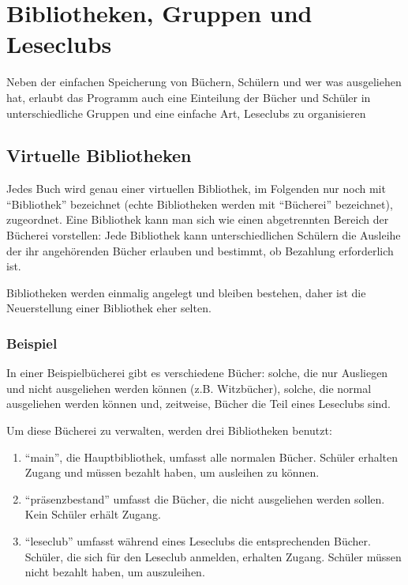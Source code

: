 \section{Bibliotheken, Gruppen und Leseclubs}
\label{sec:library_group}
Neben der einfachen Speicherung von Büchern, Schülern und wer was ausgeliehen hat, erlaubt das Programm auch eine Einteilung der Bücher und Schüler in unterschiedliche Gruppen und eine einfache Art, Leseclubs zu organisieren

\subsection{Virtuelle Bibliotheken}
\label{subsec:library_group:library}
Jedes Buch wird genau einer virtuellen Bibliothek, im Folgenden nur noch mit ``Bibliothek'' bezeichnet (echte Bibliotheken werden mit ``Bücherei'' bezeichnet), zugeordnet. 
Eine Bibliothek kann man sich wie einen abgetrennten Bereich der Bücherei vorstellen: Jede Bibliothek kann unterschiedlichen Schülern die Ausleihe der ihr angehörenden Bücher erlauben und bestimmt, ob Bezahlung erforderlich ist.

Bibliotheken werden einmalig angelegt und bleiben bestehen, daher ist die Neuerstellung einer Bibliothek eher selten.

\subsubsection{Beispiel}
\label{subsubsec:library_group:library:example}
In einer Beispielbücherei gibt es verschiedene Bücher: solche, die nur Ausliegen und nicht ausgeliehen werden können (z.B. Witzbücher), solche, die normal ausgeliehen werden können und, zeitweise, Bücher die Teil eines Leseclubs sind.

Um diese Bücherei zu verwalten, werden drei Bibliotheken benutzt:

\begin{enumerate}
\item ``main'', die Hauptbibliothek, umfasst alle normalen Bücher. Schüler erhalten Zugang und müssen bezahlt haben, um ausleihen zu können.
\item ``präsenzbestand'' umfasst die Bücher, die nicht ausgeliehen werden sollen. Kein Schüler erhält Zugang.
\item ``leseclub'' umfasst während eines Leseclubs die entsprechenden Bücher. Schüler, die sich für den Leseclub anmelden, erhalten Zugang. Schüler müssen nicht bezahlt haben, um auszuleihen.
\end{enumerate}

